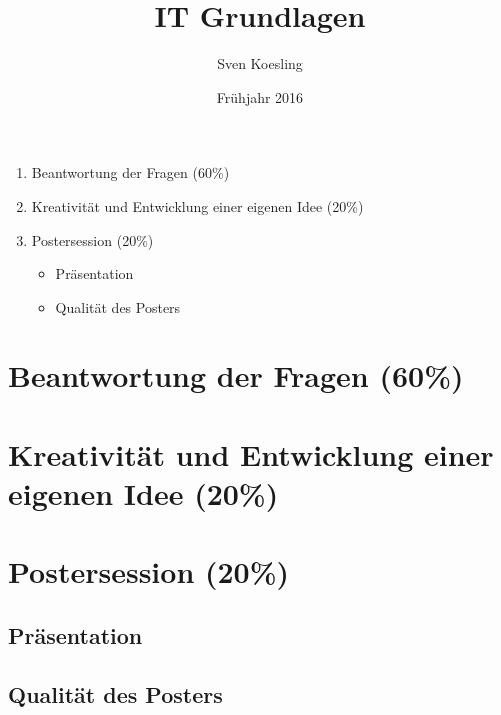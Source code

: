 \documentclass[german,headsepline]{scrartcl}
\title{IT Grundlagen}
\author{Sven Koesling}
\date{Frühjahr 2016}
\begin{document}
\begin{enumerate}
  \item Beantwortung der Fragen (60\%)
  \item Kreativität und Entwicklung einer eigenen Idee (20\%)
  \item Postersession (20\%)
  \begin{itemize}
    \item Präsentation
    \item Qualität des Posters
  \end{itemize}
\end{enumerate}
  
\section{Beantwortung der Fragen (60\%)}
\subsection{}
\subsection{}
\subsection{}

\section{Kreativität und Entwicklung einer eigenen Idee (20\%)}

\section{Postersession (20\%)}
\subsection{Präsentation}
\subsection{Qualität des Posters}
\end{document}
